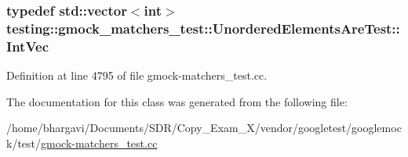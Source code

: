 \subsubsection[{\texorpdfstring{Int\+Vec}{IntVec}}]{\setlength{\rightskip}{0pt plus 5cm}typedef std\+::vector$<$int$>$ {\bf testing\+::gmock\+\_\+matchers\+\_\+test\+::\+Unordered\+Elements\+Are\+Test\+::\+Int\+Vec}\hspace{0.3cm}{\ttfamily [protected]}}\hypertarget{classtesting_1_1gmock__matchers__test_1_1_unordered_elements_are_test_a608750c71652943bd11fe7bb5281588d}{}\label{classtesting_1_1gmock__matchers__test_1_1_unordered_elements_are_test_a608750c71652943bd11fe7bb5281588d}


Definition at line 4795 of file gmock-\/matchers\+\_\+test.\+cc.



The documentation for this class was generated from the following file\+:\begin{DoxyCompactItemize}
\item 
/home/bhargavi/\+Documents/\+S\+D\+R/\+Copy\+\_\+\+Exam\+\_\+X/vendor/googletest/googlemock/test/\hyperlink{gmock-matchers__test_8cc}{gmock-\/matchers\+\_\+test.\+cc}\end{DoxyCompactItemize}

